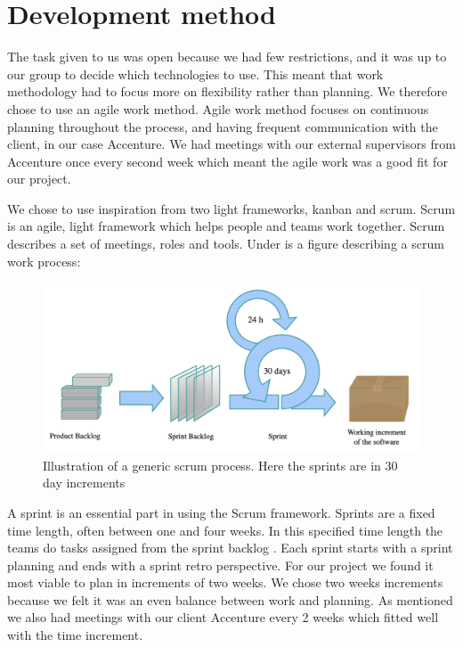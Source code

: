 \section{Development method}\label{devmethod}
The task given to us was open because we had few restrictions, and it was up to our group to decide which technologies to use. This meant that work methodology had to focus more on flexibility rather than planning. We therefore chose to use an agile work method. Agile work method focuses on continuous planning throughout the process, and having frequent communication with the client, in our case Accenture. We had meetings with our external supervisors from Accenture once every second week which meant the agile work was a good fit for our project. 

We chose to use inspiration from two light frameworks, kanban and scrum. Scrum is an agile,  light framework which helps people and teams work together. Scrum describes a set of meetings, roles and tools. Under is a figure describing a scrum work process:

\begin{figure}[h!]
	\centering
	\includegraphics[width=1\linewidth]{figures/scrum_process}
	\caption[scrum process]{Illustration of a generic scrum process. Here the sprints are in 30 day increments}
	\label{fig:scrumprocess}
\end{figure}


A sprint is an essential part in using the Scrum framework. Sprints are a fixed time length, often between one and four weeks. In this specified time length the teams do tasks assigned from the sprint backlog . Each sprint starts with a sprint planning and ends with a sprint retro perspective. For our project we found it most viable to plan in increments of two weeks. We chose two weeks increments because we felt it was an even balance between work and planning. As mentioned we also had meetings with our client Accenture every 2 weeks which fitted well with the time increment.  

